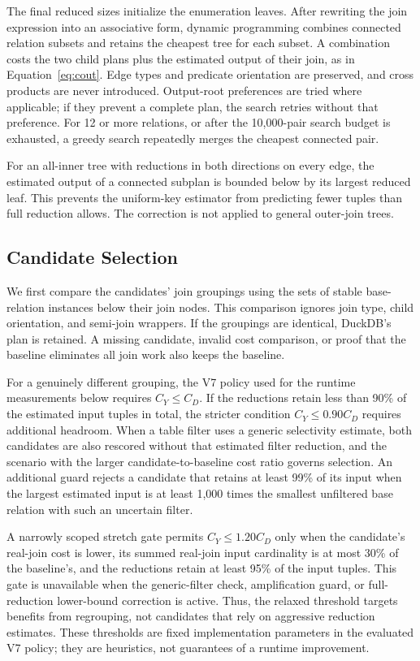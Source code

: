 The final reduced sizes initialize the enumeration leaves. After rewriting
the join expression into an associative form, dynamic programming combines
connected relation subsets and retains the cheapest tree for each subset.
A combination costs the two child plans plus the estimated output of their
join, as in Equation~\ref{eq:cout}. Edge types and predicate orientation are
preserved, and cross products are never introduced. Output-root preferences
are tried where applicable; if they prevent a complete plan, the search
retries without that preference. For 12 or more relations, or after the
10,000-pair search budget is exhausted, a greedy search repeatedly merges
the cheapest connected pair.

For an all-inner tree with reductions in both directions on every edge,
the estimated output of a connected subplan is bounded below by its largest
reduced leaf. This prevents the uniform-key estimator from predicting fewer
tuples than full reduction allows. The correction is not applied to general
outer-join trees.

\subsection{Candidate Selection}
\label{sec:plan-selection}

We first compare the candidates' join groupings using the sets of stable
base-relation instances below their join nodes. This comparison ignores
join type, child orientation, and semi-join wrappers. If the groupings are
identical, DuckDB's plan is retained. A missing candidate, invalid cost
comparison, or proof that the baseline eliminates all join work also keeps
the baseline.

For a genuinely different grouping, the V7 policy used for the runtime
measurements below requires $C_Y\leq C_D$.
If the reductions retain less than 90\% of the estimated input tuples in
total, the stricter condition $C_Y\leq0.90C_D$ requires additional headroom.
When a table filter uses a generic selectivity estimate, both candidates
are also rescored without that estimated filter reduction, and the scenario
with the larger candidate-to-baseline cost ratio governs selection.
An additional guard rejects a candidate that retains at least 99\% of its
input when the largest estimated input is at least 1,000 times the smallest
unfiltered base relation with such an uncertain filter.

A narrowly scoped stretch gate permits $C_Y\leq1.20C_D$ only when the
candidate's real-join cost is lower, its summed real-join input cardinality
is at most 30\% of the baseline's, and the reductions retain at least 95\%
of the input tuples. This gate is unavailable when the generic-filter
check, amplification guard, or full-reduction lower-bound correction is
active. Thus, the relaxed threshold targets benefits from regrouping, not
candidates that rely on aggressive reduction estimates. These thresholds
are fixed implementation parameters in the evaluated V7 policy; they are
heuristics, not guarantees of a runtime improvement.

